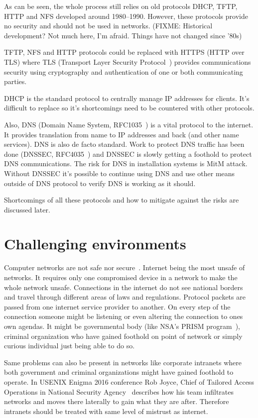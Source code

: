 As can be seen, the whole process still relies on old protocols DHCP,
TFTP, HTTP and NFS developed around 1980--1990. However, these
protocols provide no security and should not be used in
networks. (FIXME: Historical development? Not much here, I'm
afraid. Things have not changed since '80s)

TFTP, NFS and HTTP protocols could be replaced with HTTPS (HTTP over
TLS) where TLS (Transport Layer Security Protocol~\cite{RFC5246})
provides communications security using cryptography and authentication
of one or both communicating parties.

DHCP is the standard protocol to centrally manage IP addresses for
clients. It's difficult to replace so it's shortcomings need to be
countered with other protocols.

Also, DNS (Domain Name System, RFC1035~\cite{rfc1035}) is a vital
protocol to the internet. It provides translation from name to IP
addresses and back (and other name services). DNS is also de facto
standard. Work to protect DNS traffic has been done (DNSSEC,
RFC4035~\cite{rfc4035}) and DNSSEC is slowly getting a foothold to
protect DNS communications. The risk for DNS in installation systems
is MitM attack. Without DNSSEC it's possible to continue using DNS and
use other means outside of DNS protocol to verify DNS is working as it
should.

Shortcomings of all these protocols and how to mitigate against the
risks are discussed later.

\section{Challenging environments}

Computer networks are not safe nor secure~\cite{beyondcorp}. Internet
being the most unsafe of networks. It requires only one compromised
device in a network to make the whole network unsafe. Connections in
the internet do not see national borders and travel through different
areas of laws and regulations. Protocol packets are passed from one
internet service provider to another. On every step of the connection
someone might be listening or even altering the connection to ones own
agendas. It might be governmental body (like NSA's PRISM
program~\cite{nsa-prism}), criminal organization who have gained
foothold on point of network or simply curious individual just being
able to do so.

Same problems can also be present in networks like corporate intranets
where both government and criminal organizations might have gained
foothold to operate. In USENIX Enigma 2016 conference Rob Joyce, Chief
of Tailored Access Operations in National Security
Agency~\cite{nsa-tao} describes how his team infiltrates networks and
moves there laterally to gain what they are after. Therefore intranets
should be treated with same level of mistrust as internet.


